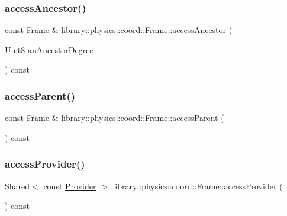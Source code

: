 \subsubsection{\texorpdfstring{access\+Ancestor()}{accessAncestor()}}
{\footnotesize\ttfamily const \hyperlink{classlibrary_1_1physics_1_1coord_1_1_frame}{Frame} \& library\+::physics\+::coord\+::\+Frame\+::access\+Ancestor (\begin{DoxyParamCaption}\item[{Uint8}]{an\+Ancestor\+Degree }\end{DoxyParamCaption}) const}

\mbox{\label{classlibrary_1_1physics_1_1coord_1_1_frame_aaa33dd0c2af00aee0ffb4278cccdc8a2}} 
\subsubsection{\texorpdfstring{access\+Parent()}{accessParent()}}
{\footnotesize\ttfamily const \hyperlink{classlibrary_1_1physics_1_1coord_1_1_frame}{Frame} \& library\+::physics\+::coord\+::\+Frame\+::access\+Parent (\begin{DoxyParamCaption}{ }\end{DoxyParamCaption}) const}

\mbox{\label{classlibrary_1_1physics_1_1coord_1_1_frame_a5da9096ace352a91d272677cc159c059}} 
\subsubsection{\texorpdfstring{access\+Provider()}{accessProvider()}}
{\footnotesize\ttfamily Shared$<$ const \hyperlink{classlibrary_1_1physics_1_1coord_1_1frame_1_1_provider}{Provider} $>$ library\+::physics\+::coord\+::\+Frame\+::access\+Provider (\begin{DoxyParamCaption}{ }\end{DoxyParamCaption}) const}

